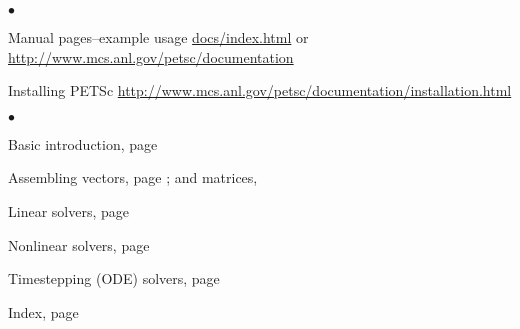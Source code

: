 
%

\medskip\medskip


\medskip


\begin{list}{$\bullet$}
{
\setlength{\itemsep}{-.020in}
\setlength{\topsep}{0in}
\setlength{\partopsep}{0in}
}
\item Manual pages--example usage
\href{index.html}{docs/index.html}  or
\href{http://www.mcs.anl.gov/petsc/documentation}{http://www.mcs.anl.gov/petsc/documentation}
\item Installing PETSc
\href{http://www.mcs.anl.gov/petsc/documentation/installation.html}{http://www.mcs.anl.gov/petsc/documentation/installation.html}
\end{list}

\medskip
{}
\begin{list}{$\bullet$}
{
\setlength{\itemsep}{-.02in}
\setlength{\topsep}{.02in}
\setlength{\partopsep}{0in}
}
\item Basic introduction, page \pageref{sec_gettingstarted}
\item Assembling vectors, page \pageref{sec_vecbasic}; and matrices, \pageref{chapter_matrices}
\item Linear solvers, page \pageref{ch_ksp}
\item Nonlinear solvers, page \pageref{chapter_snes}
\item Timestepping (ODE) solvers, page \pageref{chapter_ts}
\item Index, page \pageref{ch_index}
\end{list}

